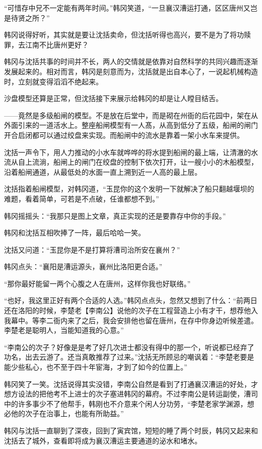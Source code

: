 “可惜存中兄不一定能有两年时间。”韩冈笑道，“一旦襄汉漕运打通，区区唐州又岂是待贤之所？”

韩冈说得好听，其实就是要让沈括卖命，但沈括听得也高兴，要不是为了将功赎罪，去江南不比唐州更好？

韩冈与沈括共事的时间并不长，两人的交情就是依靠对自然科学的共同兴趣而逐渐发展起来的。相对而言，韩冈是刻意而为，沈括就是出自本心了，一说起机械构造时，立刻就变得滔滔不绝起来。

沙盘模型还算是正常，但沈括接下来展示给韩冈的却是让人瞠目结舌。

——竟然是多级船闸的模型。不是放在后堂中，而是砌在州衙的后花园中，架在从外面引来的一道活水上。整座船闸模型有一人髙，从高到低分了五级，船闸的闸门开合启闭都可以通过绞盘来实现。而船闸中的流水是靠着一架小水车来提供。

沈括一声令下，用人力推动的小水车就哗哗的将水提到船闸的最上端，让清澈的水流从自上流淌，船闸上的闸门在绞盘的控制下依次打开，让一艘小小的木船模型，沿着船闸通道，从最低处的水面一直上溯到近一人高的最上层。

沈括指着船闸模型，对韩冈道，“玉昆你的这个发明一下就解决了船只翻越堰坝的难题，看着简单，可若是不点破，任谁都想不到。”

韩冈摇摇头：“我那只是图上文章，真正实现的还是要靠存中你的手段。”

韩冈和沈括互相吹捧了一阵，最后哈哈一笑。

沈括又问道：“玉昆你是不是打算将漕司治所安在襄州？”

韩冈点头：“襄阳是漕运源头，襄州比洛阳更合适。”

“那你最好能留一两个心腹之人在唐州，这样你我也好联络。”

“也好，我这里正好有两个合适的人选。”韩冈点点头，忽然又想到了什么：“前两日还在洛阳的时候，李楚老【李南公】说他的次子在工程营造上小有才干，想荐他入我幕中。等李二衙内来了之后，我会安排他也留在唐州，在存中你身边听候差遣。李楚老是聪明人，当能知道我的心意。”

“李南公的次子？好像是是考了好几次进士都没有得中的那一个，听说都已经弃了功名，出去云游了。还当真敢推荐了过来。”沈括无所顾忌的嘲讽着：“李楚老要是能少些私心，也不至于四十年宦海，才到了如今的位置上。”

韩冈笑了一笑。沈括说得其实没错，李南公自然是看到了打通襄汉漕运的好处，才想方设法的把他考不上进士的次子塞进韩冈的幕府。不过李南公是转运副使，漕司中的许多事少不了他帮手，韩刚也不介意来个闲人分功劳，“李楚老家学渊源，想必他的次子在治事上，也能有所助益。”

韩冈与沈括一直聊到了深夜，回到了寅宾馆，短短的睡了两个时辰，韩冈又起来和沈括去了城外，查看即将成为襄汉漕运主要通道的泌水和堵水。

